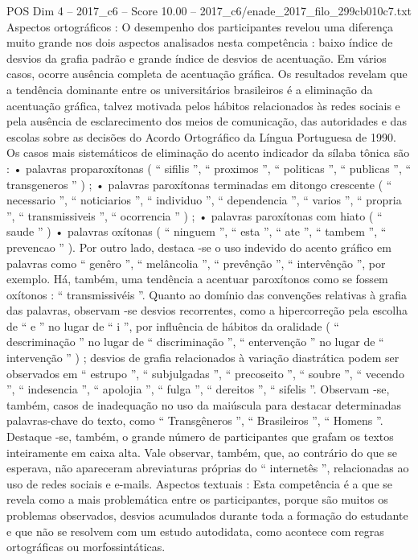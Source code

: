 \begin{textsample}{POS Dim 4 – 2017\_c6 – Score 10.00 – 2017\_c6/enade\_2017\_filo\_299cb010c7.txt}
Aspectos ortográficos : O desempenho dos participantes revelou uma diferença muito grande nos dois aspectos analisados nesta competência : baixo índice de desvios da grafia padrão e grande índice de desvios de acentuação.
Em vários casos, ocorre ausência completa de acentuação gráfica.
Os resultados revelam que a tendência dominante entre os universitários brasileiros é a eliminação da acentuação gráfica, talvez motivada pelos hábitos relacionados às redes sociais e pela ausência de esclarecimento dos meios de comunicação, das autoridades e das escolas sobre as decisões do Acordo Ortográfico da Língua Portuguesa de 1990.
Os casos mais sistemáticos de eliminação do acento indicador da sílaba tônica são : • palavras proparoxítonas ( “ sifilis ”, “ proximos ”, “ politicas ”, “ publicas ”, “ transgeneros ” ) ; • palavras paroxítonas terminadas em ditongo crescente ( “ necessario ”, “ noticiarios ”, “ individuo ”, “ dependencia ”, “ varios ”, “ propria ”, “ transmissiveis ”, “ ocorrencia ” ) ; • palavras paroxítonas com hiato ( “ saude ” ) • palavras oxítonas ( “ ninguem ”, “ esta ”, “ ate ”, “ tambem ”, “ prevencao ” ).
Por outro lado, destaca -se o uso indevido do acento gráfico em palavras como “ genêro ”, “ melâncolia ”, “ prevênção ”, “ intervênção ”, por exemplo.
Há, também, uma tendência a acentuar paroxítonos como se fossem oxítonos : “ transmissivéis ”.
Quanto ao domínio das convenções relativas à grafia das palavras, observam -se desvios recorrentes, como a hipercorreção pela escolha de “ e ” no lugar de “ i ”, por influência de hábitos da oralidade ( “ descriminação ” no lugar de “ discriminação ”, “ entervenção ” no lugar de “ intervenção ” ) ; desvios de grafia relacionados à variação diastrática podem ser observados em “ estrupo ”, “ subjulgadas ”, “ precoseito ”, “ soubre ”, “ vecendo ”, “ indesencia ”, “ apolojia ”, “ fulga ”, “ dereitos ”, “ sifelis ”.
Observam -se, também, casos de inadequação no uso da maiúscula para destacar determinadas palavras-chave do texto, como “ Transgêneros ”, “ Brasileiros ”, “ Homens ”.
Destaque -se, também, o grande número de participantes que grafam os textos inteiramente em caixa alta.
Vale observar, também, que, ao contrário do que se esperava, não apareceram abreviaturas próprias do “ internetês ”, relacionadas ao uso de redes sociais e e-mails.
Aspectos textuais : Esta competência é a que se revela como a mais problemática entre os participantes, porque são muitos os problemas observados, desvios acumulados durante toda a formação do estudante e que não se resolvem com um estudo autodidata, como acontece com regras ortográficas ou morfossintáticas.

\end{textsample}
